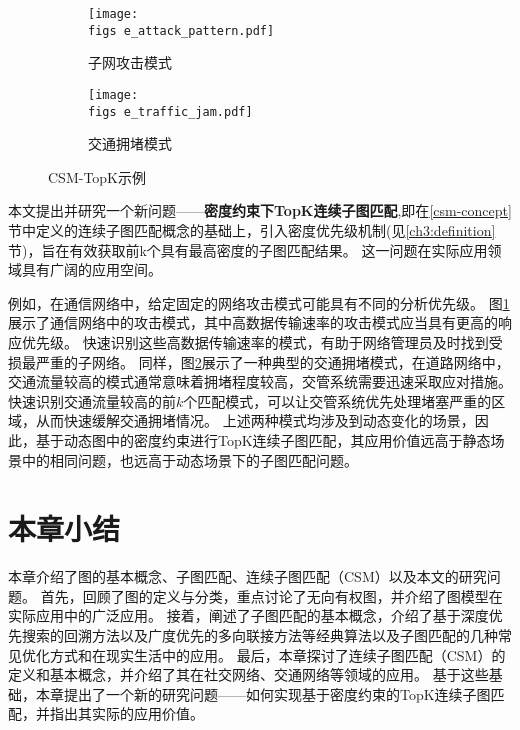 \begin{figure}[h!]
    \def\wscorevone{0.49}
    \centering
        \begin{subfigure}[t]{\wscorevone\linewidth}
            \centering
            \resizebox{\linewidth}{!}
            {
                \texttt{[image: \\figs e\_attack\_pattern.pdf]}
            }
            \caption{子网攻击模式~\cite{static-topk-Gupta-DBLP:conf/icde/GuptaGYCH14}}
            \label{fig:example_attack_pattern}
        \end{subfigure}
        \hfill
        \begin{subfigure}[t]{\wscorevone\linewidth}
            \centering
            \resizebox{\linewidth}{!}
            {
                \texttt{[image: \\figs e\_traffic\_jam.pdf]}
            }
            \caption{交通拥堵模式~\cite{traffic-graph-matching-DBLP:journals/pvldb/SongGCW14}}
            \label{fig:example_traffic_jam}
        \end{subfigure}
        \label{fig:definition}
        \caption{CSM-TopK示例}
    \end{figure}

本文提出并研究一个新问题——\textbf{密度约束下TopK连续子图匹配},即在\ref{csm-concept}节中定义的连续子图匹配概念的基础上，引入密度优先级机制(见\ref{ch3:definition}节)，旨在有效获取前k个具有最高密度的子图匹配结果。
这一问题在实际应用领域具有广阔的应用空间。

例如，在通信网络中，给定固定的网络攻击模式可能具有不同的分析优先级。
图\ref{fig:example_attack_pattern}展示了通信网络中的攻击模式\cite{static-topk-Gupta-DBLP:conf/icde/GuptaGYCH14}，其中高数据传输速率的攻击模式应当具有更高的响应优先级。
快速识别这些高数据传输速率的模式，有助于网络管理员及时找到受损最严重的子网络。
同样，图\ref{fig:example_traffic_jam}展示了一种典型的交通拥堵模式\cite{traffic-graph-matching-DBLP:journals/pvldb/SongGCW14}，在道路网络中，交通流量较高的模式通常意味着拥堵程度较高，交管系统需要迅速采取应对措施。
快速识别交通流量较高的前$k$个匹配模式，可以让交管系统优先处理堵塞严重的区域，从而快速缓解交通拥堵情况。
上述两种模式均涉及到动态变化的场景，因此，基于动态图中的密度约束进行TopK连续子图匹配，其应用价值远高于静态场景中的相同问题，也远高于动态场景下的子图匹配问题。

\section{本章小结}
本章介绍了图的基本概念、子图匹配、连续子图匹配（CSM）以及本文的研究问题。
首先，回顾了图的定义与分类，重点讨论了无向有权图，并介绍了图模型在实际应用中的广泛应用。
接着，阐述了子图匹配的基本概念，介绍了基于深度优先搜索的回溯方法以及广度优先的多向联接方法等经典算法以及子图匹配的几种常见优化方式和在现实生活中的应用。
最后，本章探讨了连续子图匹配（CSM）的定义和基本概念，并介绍了其在社交网络、交通网络等领域的应用。
基于这些基础，本章提出了一个新的研究问题——如何实现基于密度约束的TopK连续子图匹配，并指出其实际的应用价值。